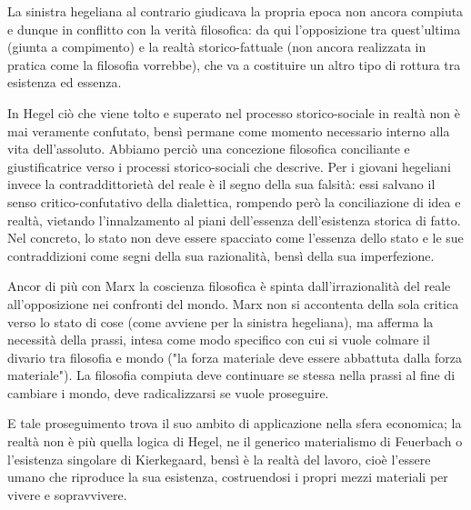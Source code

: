 La sinistra hegeliana al contrario giudicava la propria epoca non ancora compiuta e dunque in conflitto con la verità filosofica: da qui l'opposizione tra quest'ultima (giunta a compimento) e la realtà storico-fattuale (non ancora realizzata in pratica come la filosofia vorrebbe), che va a costituire un altro tipo di rottura tra esistenza ed essenza.
 
 In Hegel ciò che viene tolto e superato nel processo storico-sociale in realtà non è mai veramente confutato, bensì permane come momento necessario interno alla vita dell'assoluto. Abbiamo perciò una concezione filosofica conciliante e giustificatrice verso i processi storico-sociali che descrive. Per i giovani hegeliani invece la contraddittorietà del reale è il segno della sua falsità: essi salvano il senso critico-confutativo della dialettica, rompendo però la conciliazione di idea e realtà, vietando l'innalzamento al piani dell'essenza dell'esistenza storica di fatto. Nel concreto, lo stato non deve essere spacciato come l'essenza dello stato e le sue contraddizioni come segni della sua razionalità, bensì della sua imperfezione.
 
 Ancor di più con Marx la coscienza filosofica è spinta dall'irrazionalità del reale all'opposizione nei confronti del mondo. Marx non si accontenta della sola critica verso lo stato di cose (come avviene per la sinistra hegeliana), ma afferma la necessità della prassi, intesa come modo specifico con cui si vuole colmare il divario tra filosofia e mondo ("la forza materiale deve essere abbattuta dalla forza materiale"). La filosofia compiuta deve continuare se stessa nella prassi al fine di cambiare i mondo, deve radicalizzarsi se vuole proseguire.
 
 E tale proseguimento trova il suo ambito di applicazione nella sfera economica; la realtà non è più quella logica di Hegel, ne il generico materialismo di Feuerbach o l'esistenza singolare di Kierkegaard, bensì è la realtà del lavoro, cioè l'essere umano che riproduce la sua esistenza, costruendosi i propri mezzi materiali per vivere e sopravvivere.
 
 